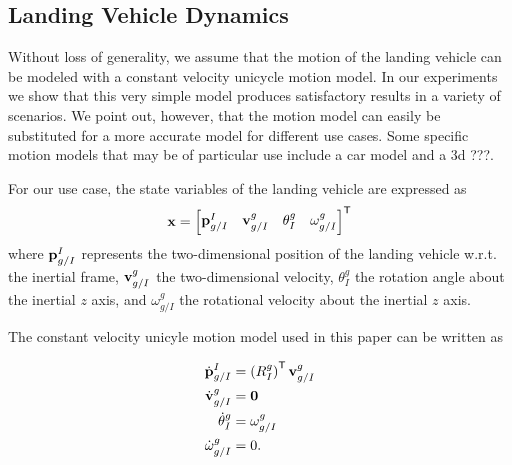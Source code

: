 
\subsection{Landing Vehicle Dynamics}
Without loss of generality, we assume that the motion of the landing vehicle can be modeled with a constant
velocity unicycle motion model. In our experiments we show that this very simple
model produces satisfactory results in a variety of scenarios. We point out,
however, that the motion model can easily be substituted for a more accurate
model for different use cases. Some specific motion models that may be of
particular use include a car model and a 3d ???.

For our use case, the state variables of the landing vehicle are expressed as
\begin{equation}
  \boldsymbol{\mathrm{x}} =
    \begin{bmatrix}
      \boldsymbol{\mathrm{p}}_{g/I}^{I} & \boldsymbol{\mathrm{v}}_{g/I}^{g} & \theta_{I}^{g} &
      \omega_{g/I}^{g}
    \end{bmatrix}^{\mathsf{T}}
\end{equation}
where $\boldsymbol{\mathrm{p}}_{g/I}^{I}$ represents the two-dimensional position of the
landing vehicle w.r.t. the inertial frame, $\boldsymbol{\mathrm{v}}_{g/I}^{g}$ the
two-dimensional velocity, $\theta_{I}^{g}$ the rotation angle about the
inertial $z$ axis, and $\omega_{g/I}^{g}$ the rotational velocity about the
inertial $z$ axis.


The constant velocity unicyle motion model used in this paper can be written as

\begin{align}
  \dot{\boldsymbol{\mathrm{p}}}_{g/I}^I
  &=
  \left( R_I^g \right)^{\mathsf{T}} \boldsymbol{\mathrm{v}}_{g/I}^g  \\
  \dot{\boldsymbol{\mathrm{v}}}_{g/I}^g
  &=
  \boldsymbol{\mathrm{0}} \\
  \dot{\theta}_{I}^g
  &=
  \omega_{g/I}^g \\
  \dot{\omega}_{g/I}^g
  &=
  0.
\end{align}
